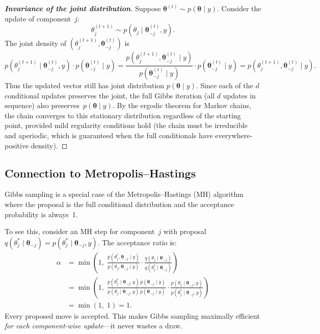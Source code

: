 \documentclass[11pt]{article}
\begin{document}
\begin{proof}[\textbf{Invariance of the joint distribution}]
Suppose $\boldsymbol{\theta}^{(t)} \sim p(\boldsymbol{\theta} \mid y)$.  Consider the update of component~$j$:
\[
  \theta_j^{(t+1)} \sim p(\theta_j \mid \boldsymbol{\theta}_{-j}^{(t)}, y).
\]
The joint density of $(\theta_j^{(t+1)}, \boldsymbol{\theta}_{-j}^{(t)})$ is
\[
  p(\theta_j^{(t+1)} \mid \boldsymbol{\theta}_{-j}^{(t)}, y) \cdot p(\boldsymbol{\theta}_{-j}^{(t)} \mid y)
  = \frac{p(\theta_j^{(t+1)}, \boldsymbol{\theta}_{-j}^{(t)} \mid y)}{p(\boldsymbol{\theta}_{-j}^{(t)} \mid y)} \cdot p(\boldsymbol{\theta}_{-j}^{(t)} \mid y)
  = p(\theta_j^{(t+1)}, \boldsymbol{\theta}_{-j}^{(t)} \mid y).
\]
Thus the updated vector still has joint distribution $p(\boldsymbol{\theta} \mid y)$.  Since each of the $d$ conditional updates preserves the joint, the full Gibbs iteration (all $d$ updates in sequence) also preserves~$p(\boldsymbol{\theta} \mid y)$.  By the ergodic theorem for Markov chains, the chain converges to this stationary distribution regardless of the starting point, provided mild regularity conditions hold (the chain must be irreducible and aperiodic, which is guaranteed when the full conditionals have everywhere-positive density).
\end{proof}

\subsection{Connection to Metropolis--Hastings}

Gibbs sampling is a special case of the Metropolis--Hastings (MH) algorithm where the proposal is the full conditional distribution and the acceptance probability is always~1.

To see this, consider an MH step for component~$j$ with proposal $q(\theta_j^* \mid \boldsymbol{\theta}_{-j}) = p(\theta_j^* \mid \boldsymbol{\theta}_{-j}, y)$.  The acceptance ratio is:
\begin{align*}
  \alpha &= \min\!\left(1, \;\frac{p(\theta_j^*, \boldsymbol{\theta}_{-j} \mid y)}{p(\theta_j, \boldsymbol{\theta}_{-j} \mid y)} \cdot \frac{q(\theta_j \mid \boldsymbol{\theta}_{-j})}{q(\theta_j^* \mid \boldsymbol{\theta}_{-j})}\right) \\[6pt]
  &= \min\!\left(1, \;\frac{p(\theta_j^*\mid\boldsymbol{\theta}_{-j},y)\,p(\boldsymbol{\theta}_{-j}\mid y)}{p(\theta_j\mid\boldsymbol{\theta}_{-j},y)\,p(\boldsymbol{\theta}_{-j}\mid y)} \cdot \frac{p(\theta_j\mid\boldsymbol{\theta}_{-j},y)}{p(\theta_j^*\mid\boldsymbol{\theta}_{-j},y)}\right) \\[6pt]
  &= \min(1, \; 1) = 1.
\end{align*}
Every proposed move is accepted.  This makes Gibbs sampling maximally efficient \emph{for each component-wise update}---it never wastes a draw.
\end{document}
